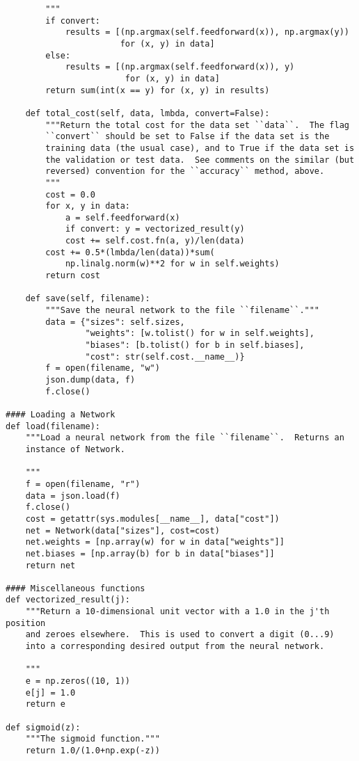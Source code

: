 \begin{lstlisting}
        """
        if convert:
            results = [(np.argmax(self.feedforward(x)), np.argmax(y))
                       for (x, y) in data]
        else:
            results = [(np.argmax(self.feedforward(x)), y)
                        for (x, y) in data]
        return sum(int(x == y) for (x, y) in results)

    def total_cost(self, data, lmbda, convert=False):
        """Return the total cost for the data set ``data``.  The flag
        ``convert`` should be set to False if the data set is the
        training data (the usual case), and to True if the data set is
        the validation or test data.  See comments on the similar (but
        reversed) convention for the ``accuracy`` method, above.
        """
        cost = 0.0
        for x, y in data:
            a = self.feedforward(x)
            if convert: y = vectorized_result(y)
            cost += self.cost.fn(a, y)/len(data)
        cost += 0.5*(lmbda/len(data))*sum(
            np.linalg.norm(w)**2 for w in self.weights)
        return cost

    def save(self, filename):
        """Save the neural network to the file ``filename``."""
        data = {"sizes": self.sizes,
                "weights": [w.tolist() for w in self.weights],
                "biases": [b.tolist() for b in self.biases],
                "cost": str(self.cost.__name__)}
        f = open(filename, "w")
        json.dump(data, f)
        f.close()

#### Loading a Network
def load(filename):
    """Load a neural network from the file ``filename``.  Returns an
    instance of Network.

    """
    f = open(filename, "r")
    data = json.load(f)
    f.close()
    cost = getattr(sys.modules[__name__], data["cost"])
    net = Network(data["sizes"], cost=cost)
    net.weights = [np.array(w) for w in data["weights"]]
    net.biases = [np.array(b) for b in data["biases"]]
    return net

#### Miscellaneous functions
def vectorized_result(j):
    """Return a 10-dimensional unit vector with a 1.0 in the j'th position
    and zeroes elsewhere.  This is used to convert a digit (0...9)
    into a corresponding desired output from the neural network.

    """
    e = np.zeros((10, 1))
    e[j] = 1.0
    return e

def sigmoid(z):
    """The sigmoid function."""
    return 1.0/(1.0+np.exp(-z))


\end{lstlisting}
